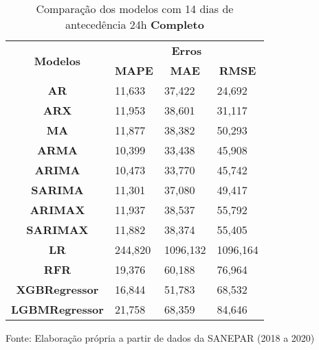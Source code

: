 \begin{table}[H]
	\centering
	\caption{Comparação dos modelos com 14 dias de antecedência 24h \textbf{Completo} }\label{tb:30-24cm}
	\begin{tabular}{@{}clll@{}}
		\toprule
		\multirow{2}{*}{\textbf{Modelos}} & \multicolumn{3}{c}{\textbf{Erros}}                                                                       \\ \cmidrule(l){2-4} 
		& \multicolumn{1}{c}{\textbf{MAPE}} & \multicolumn{1}{c}{\textbf{MAE}} & \multicolumn{1}{c}{\textbf{RMSE}} \\ \hline
\textbf{AR}                       & 11,633                            & 37,422                           & 24,692                            \\
\textbf{ARX}                      & 11,953                            & 38,601                           & 31,117                            \\
\textbf{MA}                       & 11,877                            & 38,382                           & 50,293                            \\
\textbf{ARMA}                     & 10,399                            & 33,438                           & 45,908                            \\
\textbf{ARIMA}                    & 10,473                            & 33,770                           & 45,742                            \\
\textbf{SARIMA}                   & 11,301                            & 37,080                           & 49,417                            \\
\textbf{ARIMAX}                   & 11,937                            & 38,537                           & 55,792                            \\
\textbf{SARIMAX}                  & 11,882                            & 38,374                           & 55,405                            \\
\textbf{LR}        & 244,820                           & 1096,132                         & 1096,164                          \\
\textbf{RFR}  & 19,376                            & 60,188                           & 76,964                            \\
\textbf{XGBRegressor}             & 16,844                            & 51,783                           & 68,532                            \\
\textbf{LGBMRegressor}            & 21,758                            & 68,359                           & 84,646                            \\ \bottomrule
	\end{tabular}

Fonte: Elaboração própria a partir de dados da SANEPAR (2018 a 2020)
\end{table}


